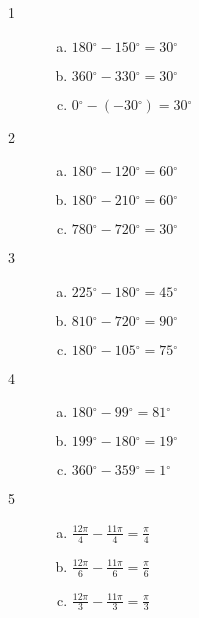 \documentclass{exam}
\newcommand{\dg}{\ensuremath{^\circ}}
\begin{document}
    \begin{description}

      \item[1] 
        \begin{enumerate}[(a)]
          \item $180 \dg - 150 \dg = \boxed{ 30 \dg }$
          \item $360 \dg - 330 \dg = \boxed{ 30 \dg }$
          \item $0 \dg - (-30 \dg) = \boxed{ 30 \dg }$
        \end{enumerate}

      \item[2] 
        \begin{enumerate}[(a)]
          \item $180 \dg - 120 \dg = \boxed{ 60 \dg }$
          \item $180 \dg - 210 \dg = \boxed{ 60 \dg }$
          \item $780 \dg - 720 \dg = \boxed{ 30 \dg }$
        \end{enumerate}

      \item[3] 
        \begin{enumerate}[(a)]
          \item $225 \dg - 180 \dg = \boxed{ 45 \dg }$
          \item $810 \dg - 720 \dg = \boxed{ 90 \dg }$
          \item $180 \dg - 105 \dg = \boxed{ 75 \dg }$
        \end{enumerate}

      \item[4] 
        \begin{enumerate}[(a)]
          \item $180 \dg - 99 \dg = \boxed{ 81 \dg }$
          \item $199 \dg - 180 \dg = \boxed{ 19 \dg }$
          \item $360 \dg - 359 \dg = \boxed{ 1 \dg }$
        \end{enumerate}

      \item[5] 
        \begin{enumerate}[(a)]
          \item $\frac{12 \pi}{4} - \frac{11 \pi}{4} = \boxed{ \frac{\pi}{4} }$
          \item $\frac{12 \pi}{6} - \frac{11 \pi}{6} = \boxed{ \frac{\pi}{6} }$
          \item $\frac{12 \pi}{3} - \frac{11 \pi}{3} = \boxed{ \frac{\pi}{3} }$
        \end{enumerate}


\end{description}
\end{document}
